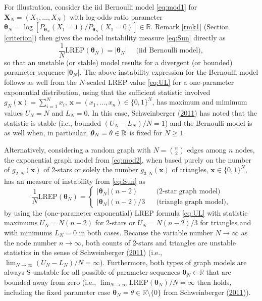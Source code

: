 \documentclass[12pt]{article}
\theoremstyle{definition}
\newcommand{\REP}{\mathrm{LREP}}
\begin{document}
For illustration, consider the iid Bernoulli model \eqref{eq:mod1} for
\(\boldsymbol X_N=(X_1,\ldots,X_N)\) with log-odds ratio parameter
\(\boldsymbol \theta_N = \log[ P_{\boldsymbol \theta_N}(X_1=1)/ P_{\boldsymbol \theta_N}(X_1=0)]\in\mathbb{R}\).
Remark \ref{rmk1} (Section \ref{criterion}) then gives the model
instability measure \eqref{eq:Sun} directly as \[
\frac{1}{N}\REP(\boldsymbol \theta_N ) = |\boldsymbol \theta_N|\quad\; \mbox{(iid Bernoulli model)},
\] so that an unstable (or stable) model results for a divergent (or
bounded) parameter sequence \(|\boldsymbol \theta_N|\). The above
instability expression for the Bernoulli model follows as well from the
\(N\)-scaled LREP value \eqref{eq:UL} for a one-parameter exponential
distribution, using that the sufficient statistic involved
\(g_N(\boldsymbol x)= \sum_{i=1}^N x_i\),
\(\boldsymbol x =(x_1,\ldots,x_n)\in\{0,1\}^N\), has maximum and mimimum
values \(U_N=N\) and \(L_N=0\). In this case, Schweinberger
(\protect\hyperlink{ref-schweinberger2011instability}{2011}) has noted
that the statistic is stable (i.e., bounded \((U_N-L_N)/N=1\)) and the
Bernoulli model is as well when, in particular,
\(\boldsymbol \theta_N=\bold \theta \in\mathbb{R}\) is fixed for
\(N \geq 1\).

Alternatively, considering a random graph with \(N={n \choose 2}\) edges
among \(n\) nodes, the exponential graph model from \eqref{eq:mod2}, when
based purely on the number of \(g_{2,N}(\boldsymbol x)\) of 2-stars or
solely the number \(g_{3,N}(\boldsymbol x)\) of triangles,
\(\boldsymbol x\in\{0,1\}^N\), has an measure of instability from
\eqref{eq:Sun} as \[
\frac{1}{N}\REP(\boldsymbol \theta_N )  = \left\{ \begin{array}{lcl} |\boldsymbol \theta_N| (n-2) && \mbox{(2-star graph model)}\\
|\boldsymbol \theta_N|(n-2)/3 &&\mbox{(triangle graph model)},\end{array}\right.
\] by using the (one-parameter exponential) LREP formula \eqref{eq:UL}
with statistic maximums \(U_N= N(n-2)\) for 2-stars or \(U_N= N(n-2)/3\)
for triangles and with minimums \(L_N=0\) in both cases. Because the
variable number \(N\to \infty\) as the node number \(n\to \infty\), both
counts of 2-stars and triangles are unstable statistics in the sense of
Schweinberger
(\protect\hyperlink{ref-schweinberger2011instability}{2011}) (i.e.,
\(\lim_{N\to \infty} (U_N-L_N)/N=\infty\)). Furthermore, both types of
graph models are always S-unstable for all possible of parameter
sequences \(\boldsymbol \theta_N \in\mathbb{R}\) that are bounded away
from zero (i.e.,
\(\lim_{N\to \infty}\REP(\boldsymbol \theta_N )/N=\infty\) then holds,
including the fixed parameter case
\(\boldsymbol \theta_N=\theta\in\mathbb{R}\setminus \{0\}\) from
Schweinberger
(\protect\hyperlink{ref-schweinberger2011instability}{2011})).
\end{document}
